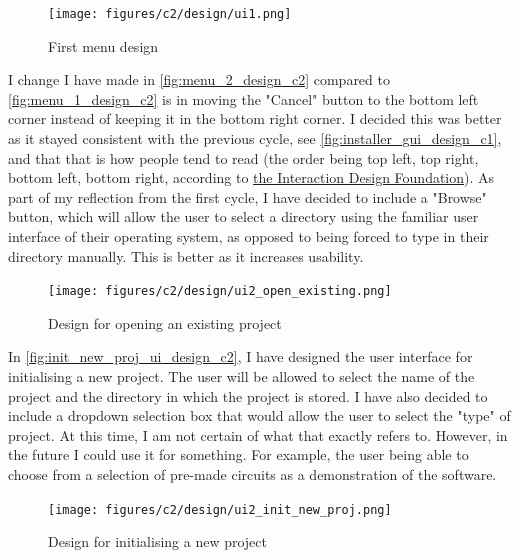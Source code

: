 \documentclass[11pt]{article}
\begin{document}
                \begin{figure}[!ht]
                    \centering
                    \texttt{[image: figures/c2/design/ui1.png]}
                    \caption{First menu design}
                    \label{fig:menu_1_design_c2}
                \end{figure}

                I change I have made in \autoref{fig:menu_2_design_c2} compared to \autoref{fig:menu_1_design_c2} is in moving the "Cancel" button to the bottom left corner instead of keeping it in the bottom right corner. I decided this was better as it stayed consistent with the previous cycle, see \autoref{fig:installer_gui_design_c1}, and that that is how people tend to read (the order being top left, top right, bottom left, bottom right, according to \href{https://www.interaction-design.org/literature/article/visual-hierarchy-organizing-content-to-follow-natural-eye-movement-patterns}{the Interaction Design Foundation}). As part of my reflection from the first cycle, I have decided to include a "Browse" button, which will allow the user to select a directory using the familiar user interface of their operating system, as opposed to being forced to type in their directory manually. This is better as it increases usability. 

                \clearpage
                \begin{figure}[!ht]
                    \centering
                    \texttt{[image: figures/c2/design/ui2\_open\_existing.png]}
                    \caption{Design for opening an existing project}
                    \label{fig:menu_2_design_c2}
                \end{figure}

                In \autoref{fig:init_new_proj_ui_design_c2}, I have designed the user interface for initialising a new project. The user will be allowed to select the name of the project and the directory in which the project is stored. I have also decided to include a dropdown selection box that would allow the user to select the "type" of project. At this time, I am not certain of what that exactly refers to. However, in the future I could use it for something. For example, the user being able to choose from a selection of pre-made circuits as a demonstration of the software.

                \begin{figure}[!ht]
                    \centering
                    \texttt{[image: figures/c2/design/ui2\_init\_new\_proj.png]}
                    \caption{Design for initialising a new project}
                    \label{fig:init_new_proj_ui_design_c2}
                \end{figure}
\end{document}
